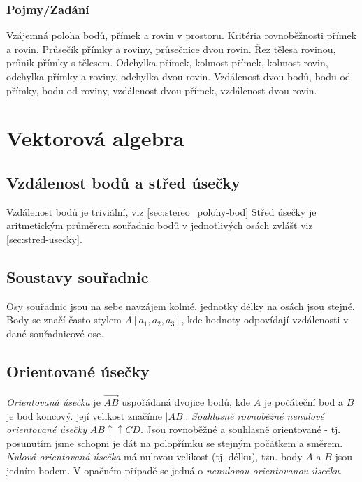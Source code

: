 \documentclass[12pt]{article}
\begin{document}
\subsubsection{Pojmy/Zadání}
Vzájemná poloha bodů, přímek a rovin v prostoru. Kritéria rovnoběžnosti přímek a rovin. Průsečík přímky a roviny, průsečnice dvou rovin. Řez tělesa rovinou, průnik přímky s tělesem. Odchylka přímek, kolmost přímek, kolmost rovin, odchylka přímky a roviny, odchylka dvou rovin. Vzdálenost dvou bodů, bodu od přímky, bodu od roviny, vzdálenost dvou přímek, vzdálenost dvou rovin.

\section{Vektorová algebra}
\subsection{Vzdálenost bodů a střed úsečky}
Vzdálenost bodů je triviální, viz \ref{sec:stereo_polohy-bod} Střed úsečky je aritmetickým průměrem souřadnic bodů v jednotlivých osách zvlášť viz \ref{sec:stred-usecky}.
\subsection{Soustavy souřadnic}
Osy souřadnic jsou na sebe navzájem kolmé, jednotky délky na osách jsou stejné. Body se značí často stylem $A[a_1, a_2, a_3]$, kde hodnoty odpovídají vzdálenosti v dané souřadnicové ose. 

\subsection{Orientované úsečky}
\emph{Orientovaná úsečka} je $\overrightarrow{AB}$ uspořádaná dvojice bodů, kde $A$ je počáteční bod a $B$ je bod koncový. její velikost značíme $|AB|$. \emph{Souhlasně rovnoběžné nenulové orientované úsečky} $AB \uparrow \uparrow CD$. Jsou rovnoběžné a souhlasně orientované - tj. posunutím jsme schopni je dát na polopřímku se stejným počátkem a směrem.\\
\emph{Nulová orientovaná úsečka} má nulovou velikost (tj. délku), tzn. body $A$ a $B$ jsou jedním bodem. V opačném případě se jedná o \emph{nenulovou orientovanou úsečku}.
\end{document}
